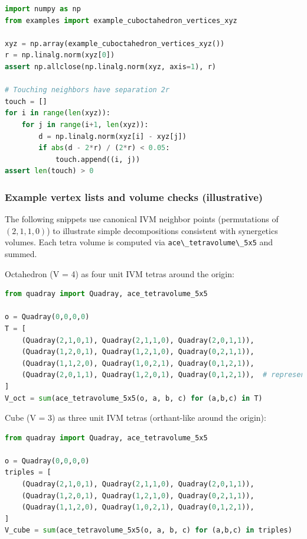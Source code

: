 \documentclass[
  10pt,
]{article}
\newcommand{\passthrough}[1]{#1}
\begin{document}
\begin{lstlisting}[language=Python]
import numpy as np
from examples import example_cuboctahedron_vertices_xyz

xyz = np.array(example_cuboctahedron_vertices_xyz())
r = np.linalg.norm(xyz[0])
assert np.allclose(np.linalg.norm(xyz, axis=1), r)

# Touching neighbors have separation 2r
touch = []
for i in range(len(xyz)):
    for j in range(i+1, len(xyz)):
        d = np.linalg.norm(xyz[i] - xyz[j])
        if abs(d - 2*r) / (2*r) < 0.05:
            touch.append((i, j))
assert len(touch) > 0
\end{lstlisting}

\hypertarget{example-vertex-lists-and-volume-checks-illustrative}{%
\subsubsection{Example vertex lists and volume checks
(illustrative)}\label{example-vertex-lists-and-volume-checks-illustrative}}

The following snippets use canonical IVM neighbor points (permutations
of \((2,1,1,0)\)) to illustrate simple decompositions consistent with
synergetics volumes. Each tetra volume is computed via
\passthrough{\lstinline!ace\_tetravolume\_5x5!} and summed.

Octahedron (V = 4) as four unit IVM tetras around the origin:

\begin{lstlisting}[language=Python]
from quadray import Quadray, ace_tetravolume_5x5

o = Quadray(0,0,0,0)
T = [
    (Quadray(2,1,0,1), Quadray(2,1,1,0), Quadray(2,0,1,1)),
    (Quadray(1,2,0,1), Quadray(1,2,1,0), Quadray(0,2,1,1)),
    (Quadray(1,1,2,0), Quadray(1,0,2,1), Quadray(0,1,2,1)),
    (Quadray(2,0,1,1), Quadray(1,2,0,1), Quadray(0,1,2,1)),  # representative variant
]
V_oct = sum(ace_tetravolume_5x5(o, a, b, c) for (a,b,c) in T)
\end{lstlisting}

Cube (V = 3) as three unit IVM tetras (orthant-like around the origin):

\begin{lstlisting}[language=Python]
from quadray import Quadray, ace_tetravolume_5x5

o = Quadray(0,0,0,0)
triples = [
    (Quadray(2,1,0,1), Quadray(2,1,1,0), Quadray(2,0,1,1)),
    (Quadray(1,2,0,1), Quadray(1,2,1,0), Quadray(0,2,1,1)),
    (Quadray(1,1,2,0), Quadray(1,0,2,1), Quadray(0,1,2,1)),
]
V_cube = sum(ace_tetravolume_5x5(o, a, b, c) for (a,b,c) in triples)
\end{lstlisting}
\end{document}

